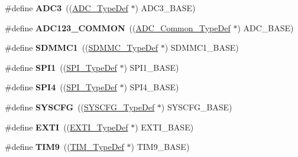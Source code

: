 \begin{DoxyCompactItemize}
\#define {\bfseries A\+D\+C3}~((\mbox{\hyperlink{struct_a_d_c___type_def}{A\+D\+C\+\_\+\+Type\+Def}} $\ast$) A\+D\+C3\+\_\+\+B\+A\+SE)
\item 
\mbox{\label{group___peripheral__declaration_ga813de18391e45c0854aafd470c2d547f}} 
\#define {\bfseries A\+D\+C123\+\_\+\+C\+O\+M\+M\+ON}~((\mbox{\hyperlink{struct_a_d_c___common___type_def}{A\+D\+C\+\_\+\+Common\+\_\+\+Type\+Def}} $\ast$) A\+D\+C\+\_\+\+B\+A\+SE)
\item 
\mbox{\label{group___peripheral__declaration_ga021d107bb9c35a201e475bd26e56fa65}} 
\#define {\bfseries S\+D\+M\+M\+C1}~((\mbox{\hyperlink{struct_s_d_m_m_c___type_def}{S\+D\+M\+M\+C\+\_\+\+Type\+Def}} $\ast$) S\+D\+M\+M\+C1\+\_\+\+B\+A\+SE)
\item 
\mbox{\label{group___peripheral__declaration_gad483be344a28ac800be8f03654a9612f}} 
\#define {\bfseries S\+P\+I1}~((\mbox{\hyperlink{struct_s_p_i___type_def}{S\+P\+I\+\_\+\+Type\+Def}} $\ast$) S\+P\+I1\+\_\+\+B\+A\+SE)
\item 
\mbox{\label{group___peripheral__declaration_ga2a2e6edef68cfe1946f39a5033da2301}} 
\#define {\bfseries S\+P\+I4}~((\mbox{\hyperlink{struct_s_p_i___type_def}{S\+P\+I\+\_\+\+Type\+Def}} $\ast$) S\+P\+I4\+\_\+\+B\+A\+SE)
\item 
\mbox{\label{group___peripheral__declaration_ga3c833fe1c486cb62250ccbca32899cb8}} 
\#define {\bfseries S\+Y\+S\+C\+FG}~((\mbox{\hyperlink{struct_s_y_s_c_f_g___type_def}{S\+Y\+S\+C\+F\+G\+\_\+\+Type\+Def}} $\ast$) S\+Y\+S\+C\+F\+G\+\_\+\+B\+A\+SE)
\item 
\mbox{\label{group___peripheral__declaration_ga9189e770cd9b63dadd36683eb9843cac}} 
\#define {\bfseries E\+X\+TI}~((\mbox{\hyperlink{struct_e_x_t_i___type_def}{E\+X\+T\+I\+\_\+\+Type\+Def}} $\ast$) E\+X\+T\+I\+\_\+\+B\+A\+SE)
\item 
\mbox{\label{group___peripheral__declaration_gaf52b4b4c36110a0addfa98059f54a50e}} 
\#define {\bfseries T\+I\+M9}~((\mbox{\hyperlink{struct_t_i_m___type_def}{T\+I\+M\+\_\+\+Type\+Def}} $\ast$) T\+I\+M9\+\_\+\+B\+A\+SE)

\end{DoxyCompactItemize}
